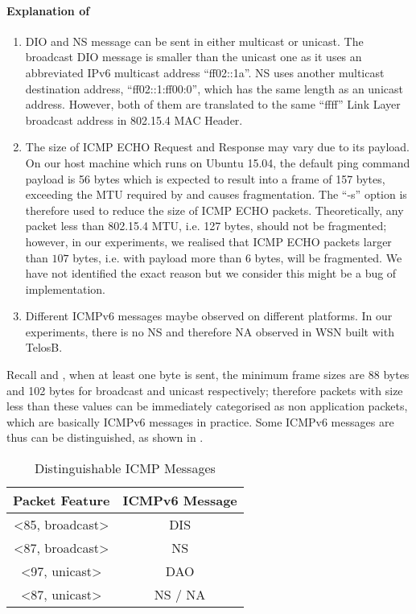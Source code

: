 \paragraph{Explanation of }
\begin{enumerate}
	\item DIO and NS message can be sent in either multicast or unicast. The broadcast DIO message is smaller than the unicast one as it uses an abbreviated IPv6 multicast address ``ff02::1a''. NS uses another multicast destination address, ``ff02::1:ff00:0'', which has the same length as an unicast address. However, both of them are translated to the same ``ffff'' Link Layer broadcast address in 802.15.4 MAC Header.
	\item The size of ICMP ECHO Request and Response may vary due to its payload. On our host machine which runs on Ubuntu 15.04, the default ping command payload is 56 bytes which is expected to result into a frame of 157 bytes, exceeding the MTU required by \cite{802154} and causes fragmentation. The ``-s'' option is therefore used to reduce the size of ICMP ECHO packets. Theoretically, any packet less than 802.15.4 MTU, i.e. 127 bytes, should not be fragmented; however, in our experiments, we realised that ICMP ECHO packets larger than $107$ bytes, i.e. with payload more than $6$ bytes, will be fragmented. We have not identified the exact reason but we consider this might be a bug of implementation.
	\item Different ICMPv6 messages maybe observed on different platforms. In our experiments, there is no NS and therefore NA observed in WSN built with TelosB.
\end{enumerate}

Recall  and , when at least one byte is sent, the minimum frame sizes are 88 bytes and 102 bytes for broadcast and unicast respectively; therefore packets with size less than these values can be immediately categorised as non application packets, which are basically ICMPv6 messages in practice. Some ICMPv6 messages are thus can be distinguished, as shown in .

\begin{table}[ht!]
	\centering
	\begin{tabular}{|c|c|}
		\hline
		Packet Feature                     & ICMPv6 Message \\ \hline
		\textless85, broadcast\textgreater & DIS            \\ \hline
		\textless87, broadcast\textgreater & NS             \\ \hline
		\textless97, unicast\textgreater   & DAO            \\ \hline
		\textless87, unicast\textgreater   & NS / NA        \\ \hline
	\end{tabular}
	\caption{Distinguishable ICMP Messages}
	\label{Tbl: Distinguishable ICMP Messages}
\end{table}

